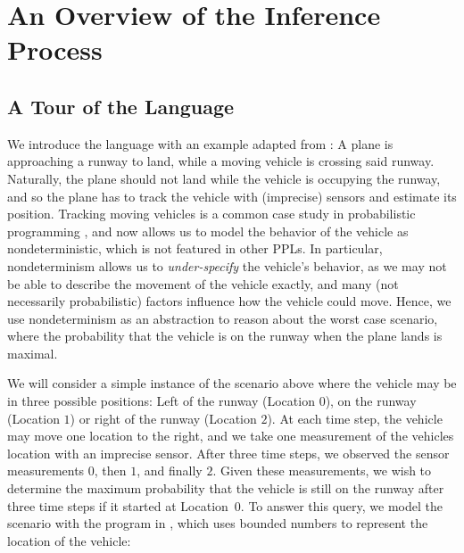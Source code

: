 
\section{An Overview of the Inference Process}\label{sec:overview}

\subsection{A Tour of the \NDICE Language}
We introduce the \NDICE language with an example adapted from \citet{junges2021runtime}:
A plane is approaching a runway to land, while a moving vehicle is crossing said runway. 
Naturally, the plane should not land while the vehicle is occupying the runway, and so the plane has to track the vehicle with (imprecise) sensors and estimate its position. 
Tracking moving vehicles is a common case study in probabilistic programming \cite{randone2024inference, cheng2025inference, baudart2020reactive}, and \NDICE now allows us to model the behavior of the vehicle as nondeterministic, which is not featured in other PPLs.
In particular, nondeterminism allows us to \textit{under-specify} the vehicle's behavior, as we may not be able to describe the movement of the vehicle exactly, and many (not necessarily probabilistic) factors influence how the vehicle could move. 
Hence, we use nondeterminism as an abstraction to reason about the worst case scenario, where the probability that the vehicle is on the runway when the plane lands is maximal.

We will consider a simple instance of the scenario above where the vehicle may be in three possible positions: Left of the runway (Location $0$), on the runway (Location $1$) or right of the runway (Location $2$).
At each time step, the vehicle may move one location to the right, and we take one measurement of the vehicles location with an imprecise sensor.
After three time steps, we observed the sensor measurements $0$, then $1$, and finally $2$. 
Given these measurements, we wish to determine the maximum probability that the vehicle is still on the runway after three time steps if it started at Location~$0$.
To answer this query, we model the scenario with the \NDICE program in , which uses bounded numbers to represent the location of the vehicle:

